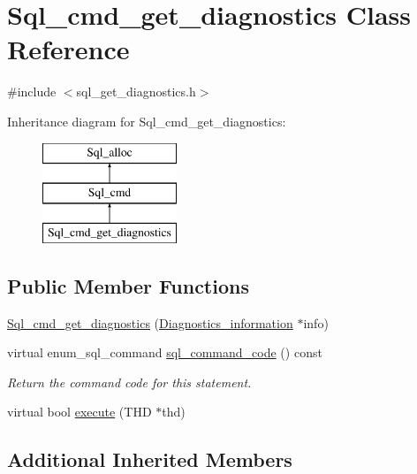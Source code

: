 \hypertarget{classSql__cmd__get__diagnostics}{}\section{Sql\+\_\+cmd\+\_\+get\+\_\+diagnostics Class Reference}
\label{classSql__cmd__get__diagnostics}


{\ttfamily \#include $<$sql\+\_\+get\+\_\+diagnostics.\+h$>$}

Inheritance diagram for Sql\+\_\+cmd\+\_\+get\+\_\+diagnostics\+:\begin{figure}[H]
\begin{center}
\leavevmode
\includegraphics[height=3.000000cm]{classSql__cmd__get__diagnostics}
\end{center}
\end{figure}
\subsection*{Public Member Functions}
\begin{DoxyCompactItemize}
\item 
\mbox{\hyperlink{classSql__cmd__get__diagnostics_abf6608b7d7c5a38eee06486520176b7c}{Sql\+\_\+cmd\+\_\+get\+\_\+diagnostics}} (\mbox{\hyperlink{classDiagnostics__information}{Diagnostics\+\_\+information}} $\ast$info)
\item 
\mbox{\label{classSql__cmd__get__diagnostics_aaa1892a89930ce67346076f321e5b823}} 
virtual enum\+\_\+sql\+\_\+command \mbox{\hyperlink{classSql__cmd__get__diagnostics_aaa1892a89930ce67346076f321e5b823}{sql\+\_\+command\+\_\+code}} () const
\begin{DoxyCompactList}\small\item\em Return the command code for this statement. \end{DoxyCompactList}\item 
virtual bool \mbox{\hyperlink{classSql__cmd__get__diagnostics_aecafd1b2d00aace5a5b238b764aadbab}{execute}} (T\+HD $\ast$thd)
\end{DoxyCompactItemize}
\subsection*{Additional Inherited Members}


